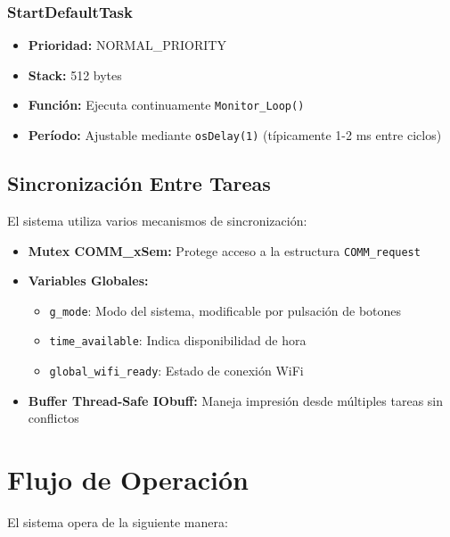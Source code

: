 \documentclass[12pt,a4paper]{article}
\begin{document}
\subsubsection{StartDefaultTask}
\begin{itemize}
    \item \textbf{Prioridad:} NORMAL\_PRIORITY
    \item \textbf{Stack:} 512 bytes
    \item \textbf{Función:} Ejecuta continuamente \texttt{Monitor\_Loop()}
    \item \textbf{Período:} Ajustable mediante \texttt{osDelay(1)} (típicamente 1-2 ms entre ciclos)
\end{itemize}

\subsection{Sincronización Entre Tareas}

El sistema utiliza varios mecanismos de sincronización:

\begin{itemize}
    \item \textbf{Mutex COMM\_xSem:} Protege acceso a la estructura \texttt{COMM\_request}
    \item \textbf{Variables Globales:}
    \begin{itemize}
        \item \texttt{g\_mode}: Modo del sistema, modificable por pulsación de botones
        \item \texttt{time\_available}: Indica disponibilidad de hora
        \item \texttt{global\_wifi\_ready}: Estado de conexión WiFi
    \end{itemize}
    \item \textbf{Buffer Thread-Safe IObuff:} Maneja impresión desde múltiples tareas sin conflictos
\end{itemize}

\section{Flujo de Operación}

El sistema opera de la siguiente manera:
\end{document}
